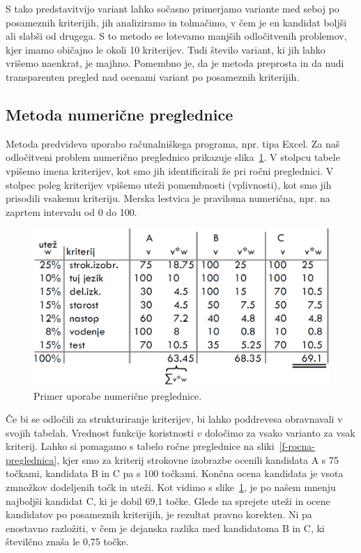 S tako predstavitvijo variant lahko sočasno primerjamo variante med seboj po posameznih kriterijih,  jih analiziramo in tolmačimo, v čem je en kandidat boljši ali slabši od drugega. S to metodo se lotevamo manjših odločitvenih problemov, kjer imamo običajno le okoli 10 kriterijev. Tudi število variant, ki jih lahko vrišemo naenkrat, je majhno. Pomembno je, da je metoda preprosta in da nudi transparenten pregled nad ocenami variant po posameznih kriterijih. 


\subsection{Metoda numerične preglednice}

Metoda predvideva uporabo računalniškega programa, npr. tipa Excel. Za naš odločitveni problem numerično preglednico prikazuje slika~\ref{f-numericna-preglednica}. V stolpcu tabele vpišemo imena kriterijev, kot smo jih identificirali že pri ročni preglednici. V stolpec poleg kriterijev vpišemo uteži pomembnosti (vplivnosti), kot smo jih prisodili vsakemu kriteriju. Merska lestvica je praviloma numerična, npr. na zaprtem intervalu od 0 do 100.

\begin{figure}[htbp]
\begin{center}
\includegraphics[width=12cm]{slike/numericna-preglednica.png}
\caption{Primer uporabe numerične preglednice.}
\label{f-numericna-preglednica}
\end{center}
\end{figure}

Če bi se odločili za strukturiranje kriterijev, bi lahko poddrevesa obravnavali v svojih tabelah. Vrednost funkcije koristnosti $v$ določimo za vsako varianto za vsak kriterij. Lahko si pomagamo s tabelo ročne preglednice na sliki~\ref{f-rocna-preglednica}, kjer smo za kriterij strokovne izobrazbe ocenili kandidata A s 75 točkami, kandidata B in C pa s 100 točkami. Končna ocena kandidata je vsota zmnožkov dodeljenih točk in uteži. Kot vidimo s slike~\ref{f-numericna-preglednica}, je po našem mnenju najboljši kandidat C, ki je dobil 69,1 točke. Glede na sprejete uteži in ocene kandidatov po posameznih kriterijih, je rezultat pravno korekten. Ni pa enostavno razložiti, v čem je dejanska razlika med kandidatoma B in C, ki številčno znaša le 0,75 točke.

